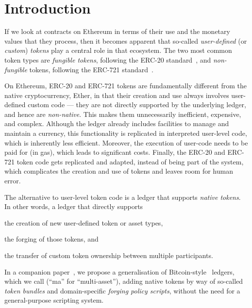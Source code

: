 \section{Introduction}

If we look at contracts on Ethereum in terms of their use and the monetary values that they process, then it becomes apparent that so-called \emph{user-defined} (or \emph{custom}) \emph{tokens} play a central role in that ecosystem. The two most common token types are \emph{fungible tokens}, following the ERC-20 standard~\cite{ERC-20}, and \emph{non-fungible} tokens, following the ERC-721 standard~\cite{ERC-721}.

On Ethereum, ERC-20 and ERC-721 tokens are fundamentally different from the native cryptocurrency, Ether, in that their creation and use always involves user-defined custom code --- they are not directly supported by the underlying ledger, and hence are \emph{non-native}.  This makes them unnecessarily inefficient, expensive, and complex. Although the ledger already includes facilities to manage and maintain a currency, this functionality is replicated in interpreted user-level code, which is inherently less efficient. Moreover, the execution of user-code needs to be paid for (in gas), which leads to significant costs. Finally, the ERC-20 and ERC-721 token code gets replicated and adapted, instead of being part of the system, which complicates the creation and use of tokens and leaves room for human error.

The alternative to user-level token code is a ledger that supports \emph{native tokens}. In other words, a ledger that directly supports
\begin{inparaenum}[(1)]
\item the creation of new user-defined token or asset types,
\item the forging of those tokens, and
\item the transfer of custom token ownership between multiple participants.
\end{inparaenum}
In a companion paper~\cite{plain-multicurrency}, we propose a generalisation of Bitcoin-style \UTXO\ ledgers, which we call \UTXOma (``ma'' for ``multi-asset''), adding native tokens by way of so-called \emph{token bundles} and domain-specific \emph{forging policy scripts}, without the need for a general-purpose scripting system.

